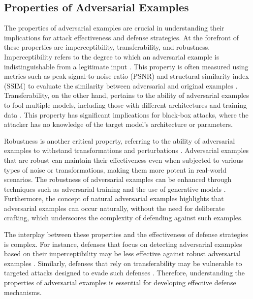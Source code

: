 \documentclass[11pt,a4paper]{article}
\begin{document}
\subsection{Properties of Adversarial Examples}


The properties of adversarial examples are crucial in understanding their implications for attack effectiveness and defense strategies. At the forefront of these properties are imperceptibility, transferability, and robustness. Imperceptibility refers to the degree to which an adversarial example is indistinguishable from a legitimate input \cite{doi:10.1145/3128572.3140444}. This property is often measured using metrics such as peak signal-to-noise ratio (PSNR) and structural similarity index (SSIM) to evaluate the similarity between adversarial and original examples \cite{arxiv:1707.07397}. Transferability, on the other hand, pertains to the ability of adversarial examples to fool multiple models, including those with different architectures and training data \cite{doi:10.1109/cvpr.2019.00284}. This property has significant implications for black-box attacks, where the attacker has no knowledge of the target model's architecture or parameters.

Robustness is another critical property, referring to the ability of adversarial examples to withstand transformations and perturbations \cite{doi:10.1109/tip.2021.3092822}. Adversarial examples that are robust can maintain their effectiveness even when subjected to various types of noise or transformations, making them more potent in real-world scenarios. The robustness of adversarial examples can be enhanced through techniques such as adversarial training and the use of generative models \cite{arxiv:1805.06605}. Furthermore, the concept of natural adversarial examples \cite{doi:10.1007/s13042-021-01435-0} highlights that adversarial examples can occur naturally, without the need for deliberate crafting, which underscores the complexity of defending against such examples.

The interplay between these properties and the effectiveness of defense strategies is complex. For instance, defenses that focus on detecting adversarial examples based on their imperceptibility may be less effective against robust adversarial examples \cite{doi:10.1609/aaai.v32i1.11828}. Similarly, defenses that rely on transferability may be vulnerable to targeted attacks designed to evade such defenses \cite{doi:10.24963/ijcai.2019/134}. Therefore, understanding the properties of adversarial examples is essential for developing effective defense mechanisms.
\end{document}

